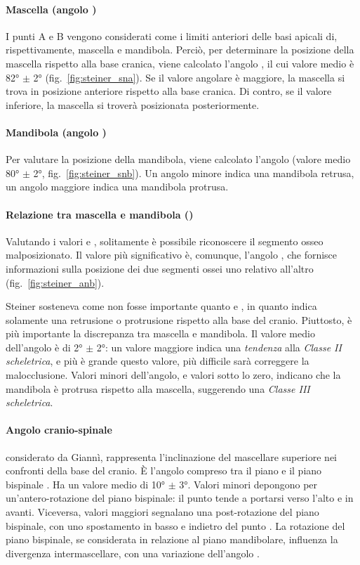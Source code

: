 \paragraph{Mascella (angolo )}
I punti A e B vengono considerati come i limiti anteriori delle basi apicali di, rispettivamente, mascella e mandibola. Perciò, per determinare la posizione della mascella rispetto alla base cranica, viene calcolato l'angolo , il cui valore medio è 82° $\pm$ 2° (fig.~\vref{fig:steiner_sna}). Se il valore angolare è maggiore, la mascella si trova in posizione anteriore rispetto alla base cranica. Di contro, se il valore inferiore, la mascella si troverà posizionata posteriormente.

\paragraph{Mandibola (angolo )}
Per valutare la posizione della mandibola, viene calcolato l'angolo  (valore medio 80° $\pm$ 2°, fig.~\ref{fig:steiner_snb}). Un angolo minore indica una mandibola retrusa, un angolo maggiore indica una mandibola protrusa.

\paragraph{Relazione tra mascella e mandibola ()}
Valutando i valori  e , solitamente è possibile riconoscere il segmento osseo malposizionato. Il valore più significativo è, comunque, l'angolo , che fornisce informazioni sulla posizione dei due segmenti ossei uno relativo all'altro (fig.~\vref{fig:steiner_anb}).

Steiner sosteneva come  non fosse importante quanto  e , in quanto indica solamente una retrusione o protrusione rispetto alla base del cranio. Piuttosto, è più importante la discrepanza tra mascella e mandibola. Il valore medio dell'angolo  è di 2° $\pm$ 2°: un valore maggiore indica una \textit{tendenza} alla \textit{Classe II scheletrica}, e più è grande questo valore, più difficile sarà correggere la malocclusione. Valori minori dell'angolo, e valori sotto lo zero, indicano che la mandibola è protrusa rispetto alla mascella, suggerendo una \textit{Classe III scheletrica}.

\paragraph{Angolo cranio-spinale} considerato da Giannì, rappresenta l'inclinazione del mascellare superiore nei confronti della base del cranio. È l'angolo compreso tra il piano  e il piano bispinale . Ha un valore medio di 10° $\pm$ 3°. Valori minori depongono per un'antero-rotazione del piano bispinale: il punto  tende a portarsi verso l'alto e in avanti. Viceversa, valori maggiori segnalano una post-rotazione del piano bispinale, con uno spostamento in basso e indietro del punto . La rotazione del piano bispinale, se considerata in relazione al piano mandibolare, influenza la divergenza intermascellare, con una variazione dell'angolo .

